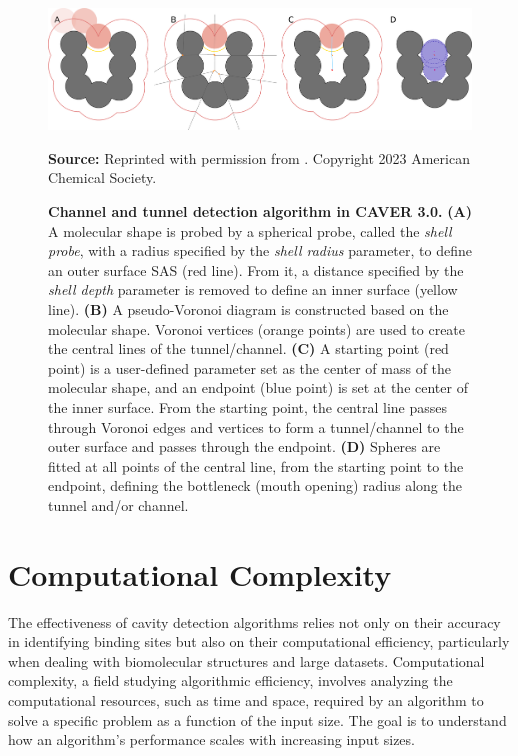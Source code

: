 \documentclass[Ingles]{phdthesis}
\begin{document}
\begin{figure}[H]
  \centerline{\includegraphics[scale=1.1]{images/caver-schema.png}}
  \centerline{\tiny{\textbf{Source:} Reprinted with permission from \cite{guerra2023B}. Copyright 2023 American Chemical Society.}}
  \caption[Channel and tunnel detection algorithm in CAVER 3.0]{\textbf{Channel and tunnel detection algorithm in CAVER 3.0.} \textbf{(A)} A molecular shape is probed by a spherical probe, called the \textit{shell probe}, with a radius specified by the \textit{shell radius} parameter, to define an outer surface \acs{SAS} (red line). From it, a distance specified by the \textit{shell depth} parameter is removed to define an inner surface (yellow line). \textbf{(B)} A pseudo-Voronoi diagram is constructed based on the molecular shape. Voronoi vertices (orange points) are used to create the central lines of the tunnel/channel. \textbf{(C)} A starting point (red point) is a user-defined parameter set as the center of mass of the molecular shape, and an endpoint (blue point) is set at the center of the inner surface. From the starting point, the central line passes through Voronoi edges and vertices to form a tunnel/channel to the outer surface and passes through the endpoint. \textbf{(D)} Spheres are fitted at all points of the central line, from the starting point to the endpoint, defining the bottleneck (mouth opening) radius along the tunnel and/or channel.}
  \label{fig:caver-schema}
\end{figure}

\section{Computational Complexity \label{sec:computational-complexity}}

The effectiveness of cavity detection algorithms relies not only on their accuracy in identifying binding sites but also on their computational efficiency, particularly when dealing with biomolecular structures and large datasets. Computational complexity, a field studying algorithmic efficiency, involves analyzing the computational resources, such as time and space, required by an algorithm to solve a specific problem as a function of the input size. The goal is to understand how an algorithm's performance scales with increasing input sizes.
\end{document}
